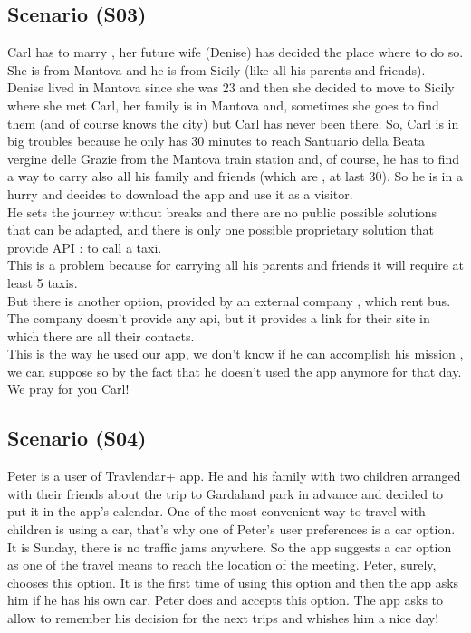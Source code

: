 \documentclass[a4paper,leqno]{book}
\begin{document}
\subsection{Scenario (S03) }
Carl has to marry , her future wife (Denise) has decided the place where to do so.\\
She is from Mantova and he is from Sicily (like all his parents and friends).\\
Denise lived in Mantova since she was 23 and then she decided to move to Sicily where she met Carl, her family is in Mantova and, sometimes she goes to find them (and of course knows the city) but Carl has never been there.
So, Carl is in big troubles because he only has 30 minutes to reach Santuario della Beata vergine delle Grazie from the Mantova train station and, of course, he has to find a way to carry also all his family and friends (which are , at last 30).
So he is in a hurry and decides to download the app and use it as a visitor.\\
He sets the journey without breaks and there are no public possible solutions that can be adapted, and there is only one possible proprietary solution that provide API : to call a taxi.\\
This is a problem because for carrying all his parents and friends it will require at least 5 taxis.\\
But there is another option, provided by an external company , which rent bus.\\
The company doesn't provide any api, but it provides a link for their site in which there are all their contacts.\\
This is the way he used our app, we don't know if he can accomplish his mission , we can suppose so by the fact that he doesn't used the app anymore for that day.\\
We pray for you Carl!\\

\subsection{Scenario (S04)}
Peter is a user of Travlendar+ app. He and his family with two children arranged with their friends about the trip to Gardaland park in advance and decided to put it in the app’s calendar. One of the most convenient way to travel with children is using a car, that’s why one of Peter’s user preferences is a car option. It is Sunday, there is no traffic jams anywhere. So the app suggests a car option as one of the travel means to reach the location of the meeting. Peter, surely, chooses this option. It is the first time of using this option and then the app asks him if he has his own car. Peter does and accepts this option. The app asks to allow to remember his decision for the next trips and whishes him a nice day!
\end{document}
